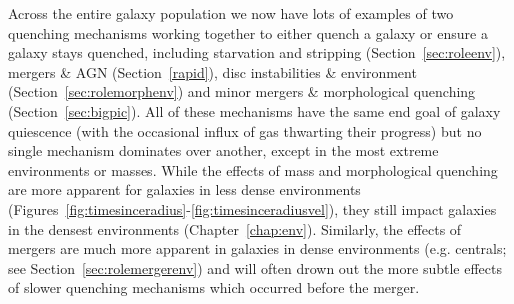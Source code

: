 Across the entire galaxy population we now have lots of examples of two quenching mechanisms working together to either quench a galaxy or ensure a galaxy stays quenched, including starvation and stripping (Section~\ref{sec:roleenv}), mergers \& AGN (Section~\ref{rapid}), disc instabilities \&  environment (Section~\ref{sec:rolemorphenv}) and minor mergers \& morphological quenching (Section~\ref{sec:bigpic}). All of these mechanisms have the same end goal of galaxy quiescence (with the occasional influx of gas thwarting their progress) but no single mechanism dominates over another, except in the most extreme environments or masses. While the effects of mass and morphological quenching are more apparent for galaxies in less dense environments (Figures~\ref{fig:timesinceradius}-\ref{fig:timesinceradiusvel}), they still impact galaxies in the densest environments (Chapter~\ref{chap:env}). Similarly, the effects of mergers are much more apparent in galaxies in dense environments (e.g. centrals; see Section~\ref{sec:rolemergerenv}) and will often drown out the more subtle effects of slower quenching mechanisms which occurred before the merger. %

